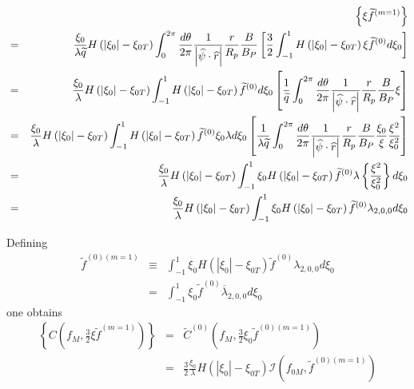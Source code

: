 \begin{eqnarray}
&&\left\{ \xi \widetilde{f}^{\left( m=1\right) }\right\}  \nonumber\\&=&\frac{\xi _{0}}{%
\lambda \widetilde{q}}H\left( \left| \xi _{0}\right| -\xi _{0T}\right)
\int_{0}^{2\pi }\frac{d\theta }{2\pi }\frac{1}{\left| \widehat{\psi }\cdot
\widehat{r}\right| }\frac{r}{R_{p}}\frac{B}{B_{P}}\left[ \frac{3}{2}
\int_{-1}^{1}H\left( \left| \xi _{0}\right| -\xi _{0T}\right) \xi \widetilde{%
f}^{\left( 0\right) }d\xi _{0}\right]   \nonumber \\
&=&\frac{\xi _{0}}{\lambda }H\left( \left| \xi _{0}\right| -\xi _{0T}\right)
\int_{-1}^{1}H\left( \left| \xi _{0}\right| -\xi _{0T}\right) \widetilde{f}
^{\left( 0\right) }d\xi _{0}\left[ \frac{1}{\widetilde{q}}\int_{0}^{2\pi }%
\frac{d\theta }{2\pi }\frac{1}{\left| \widehat{\psi }\cdot \widehat{r}%
\right| }\frac{r}{R_{p}}\frac{B}{B_{P}}\xi \right]   \nonumber \\
&=&\frac{\xi _{0}}{\lambda }H\left( \left| \xi _{0}\right| -\xi _{0T}\right)
\int_{-1}^{1}H\left( \left| \xi _{0}\right| -\xi _{0T}\right) \widetilde{f}%
^{\left( 0\right) }\xi _{0}\lambda d\xi _{0}\left[ \frac{1}{\lambda
\widetilde{q}}\int_{0}^{2\pi }\frac{d\theta }{2\pi }\frac{1}{\left| \widehat{%
\psi }\cdot \widehat{r}\right| }\frac{r}{R_{p}}\frac{B}{B_{P}}\frac{\xi _{0}%
}{\xi }\frac{\xi ^{2}}{\xi _{0}^{2}}\right]   \nonumber \\
&=&\frac{\xi _{0}}{\lambda }H\left( \left| \xi _{0}\right| -\xi _{0T}\right)
\int_{-1}^{1}\xi _{0}H\left( \left| \xi _{0}\right| -\xi _{0T}\right)
\widetilde{f}^{\left( 0\right) }\lambda \left\{ \frac{\xi ^{2}}{\xi _{0}^{2}}%
\right\} d\xi _{0}  \nonumber \\
&=&\frac{\xi _{0}}{\lambda }H\left( \left| \xi _{0}\right| -\xi _{0T}\right)
\int_{-1}^{1}\xi _{0}H\left( \left| \xi _{0}\right| -\xi _{0T}\right)
\widetilde{f}^{\left( 0\right) }\lambda _{2,0,0}d\xi _{0}
\end{eqnarray}

Defining
\begin{eqnarray}
\widetilde{f}^{\left( 0\right) \left( m=1\right) } &\equiv &\int_{-1}^{1}\xi
_{0}H\left( \left| \xi _{0}\right| -\xi _{0T}\right) \widetilde{f}^{\left(
0\right) }\lambda _{2,0,0}d\xi _{0}  \nonumber \\
&=&\int_{-1}^{1}\xi _{0}\widetilde{f}^{\left( 0\right) }\overline{\lambda }%
_{2,0,0}d\xi _{0}
\end{eqnarray}
one obtains
\begin{eqnarray}
\left\{ C\left( f_{M},\frac{3}{2}\xi \widetilde{f}^{\left( m=1\right)
}\right) \right\} &=&\widetilde{C}^{\left( 0\right) }\left( f_{M},\frac{3}{2}%
\xi _{0}\widetilde{f}^{\left( 0\right) \left( m=1\right) }\right)  \nonumber
\\
&=&\frac{3}{2}\frac{\xi _{0}}{\lambda }H\left( \left| \xi _{0}\right| -\xi
_{0T}\right) \mathcal{I}\left( f_{0M},\widetilde{f}^{\left( 0\right) \left(
m=1\right) }\right)
\end{eqnarray}

